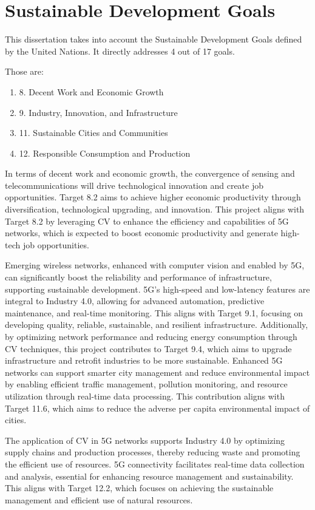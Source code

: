 
\chapter*{Sustainable Development Goals}
This dissertation takes into account the Sustainable Development Goals defined by the United Nations.
It directly addresses 4 out of 17 goals.

Those are:
\begin{enumerate}[label=]
    \item 8. Decent Work and Economic Growth
    \item 9. Industry, Innovation, and Infrastructure
    \item 11. Sustainable Cities and Communities
    \item 12. Responsible Consumption and Production
\end{enumerate}

In terms of decent work and economic growth, the convergence of sensing and telecommunications will drive technological innovation and create job opportunities.
Target 8.2 aims to achieve higher economic productivity through diversification, technological upgrading, and innovation.
This project aligns with Target 8.2 by leveraging CV to enhance the efficiency and capabilities of 5G networks, which is expected to boost economic productivity and generate high-tech job opportunities.

Emerging wireless networks, enhanced with computer vision and enabled by 5G, can significantly boost the reliability and performance of infrastructure, supporting sustainable development.
5G's high-speed and low-latency features are integral to Industry 4.0, allowing for advanced automation, predictive maintenance, and real-time monitoring.
This aligns with Target 9.1, focusing on developing quality, reliable, sustainable, and resilient infrastructure.
Additionally, by optimizing network performance and reducing energy consumption through CV techniques, this project contributes to Target 9.4, which aims to upgrade infrastructure and retrofit industries to be more sustainable.
Enhanced 5G networks can support smarter city management and reduce environmental impact by enabling efficient traffic management, pollution monitoring, and resource utilization through real-time data processing.
This contribution aligns with Target 11.6, which aims to reduce the adverse per capita environmental impact of cities.

The application of CV in 5G networks supports Industry 4.0 by optimizing supply chains and production processes, thereby reducing waste and promoting the efficient use of resources.
5G connectivity facilitates real-time data collection and analysis, essential for enhancing resource management and sustainability.
This aligns with Target 12.2, which focuses on achieving the sustainable management and efficient use of natural resources.

